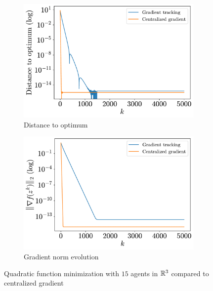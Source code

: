 \documentclass[a4paper,11pt,oneside]{book}
\begin{document}
\begin{figure}[tb!]
      \centering
      \begin{subfigure}[t]{0.46\linewidth}
            \centering
            \includegraphics[width=\linewidth]{./figs/quadratic/centralized/distance.pdf} 
            \caption{Distance to optimum}
      \end{subfigure}
      \hfill
      \begin{subfigure}[t]{0.46\linewidth}
            \centering
            \includegraphics[width=\linewidth]{./figs/quadratic/centralized/gradient.pdf} 
            \caption{Gradient norm evolution}
      \end{subfigure}
      \caption{Quadratic function minimization with $15$ agents in ${\mathbb{R}}^{3}$ compared to centralized gradient}
      \label{fig:quadratic_centralized_15_3}
\end{figure}
\end{document}
